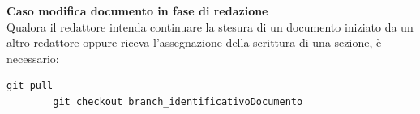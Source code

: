 \documentclass{article}
\begin{document}

    \textbf{Caso modifica documento in fase di redazione}\\
   Qualora il redattore intenda continuare la stesura di un documento iniziato da un altro redattore oppure riceva l'assegnazione della scrittura di una sezione, è necessario:

        \begin{lstlisting}[style=code]
        git pull
        git checkout branch_identificativoDocumento

        \end{lstlisting}
\end{document}
